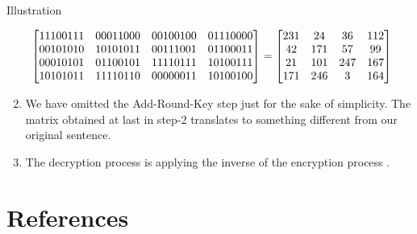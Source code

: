 \documentclass{beamer}
\begin{document}
\begin{frame}[allowframebreaks]{Illustration}
\begin{enumerate}
  \framebreak
  \[\hspace{-5mm}\begin{bmatrix}
      11100111 & 00011000 & 00100100 & 01110000\\
      00101010 & 10101011 & 00111001 & 01100011\\
      00010101 & 01100101 & 11110111 & 10100111\\
      10101011 & 11110110 & 00000011 & 10100100
    \end{bmatrix}=
    \begin{bmatrix}
      231 & 24 & 36 & 112\\
      42 & 171 & 57 & 99\\
      21 & 101 & 247 & 167\\
      171 & 246 & 3 & 164
    \end{bmatrix}
  \]
  \vspace{5mm}

\item We have omitted the Add-Round-Key step just for the sake of simplicity. The matrix obtained at last in step-2 translates to something different from our original sentence.

  \vspace{5mm}

\item The decryption process is applying the inverse of the encryption process \cite{aes}.
\end{enumerate}
\end{frame}

\section{References}
\end{document}
